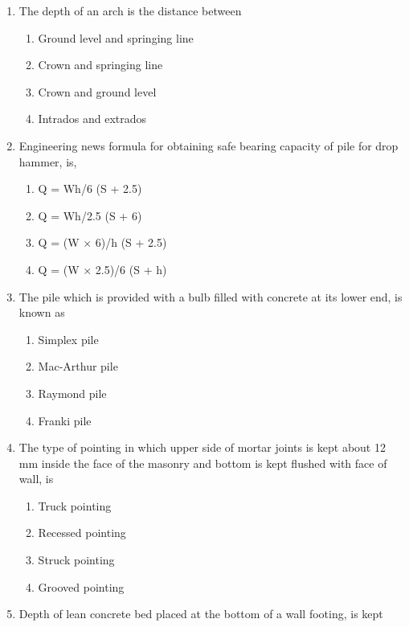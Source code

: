 \documentclass[11pt,a4paper]{article}
\begin{document}
\begin{enumerate}
\\
\item{The depth of an arch is the distance between}
\begin{enumerate}[label=\Alph*.]
\item{Ground level and springing line}
\item{Crown and springing line}
\item{Crown and ground level}
\item{Intrados and extrados}
\end{enumerate}
\item{Engineering news formula for obtaining safe bearing capacity of pile for drop hammer, is,}
\begin{enumerate}[label=\Alph*.]
\item{Q = Wh/6 (S + 2.5)}
\item{Q = Wh/2.5 (S + 6)}
\item{Q = (W $\times$ 6)/h (S + 2.5)}
\item{Q = (W $\times$ 2.5)/6 (S + h)}
\end{enumerate}
\item{The pile which is provided with a bulb filled with concrete at its lower end, is known as}
\begin{enumerate}[label=\Alph*.]
\item{Simplex pile}
\item{Mac-Arthur pile}
\item{Raymond pile}
\item{Franki pile}
\end{enumerate}
\item{The type of pointing in which upper side of mortar joints is kept about 12 mm inside the face of the masonry and bottom is kept flushed with face of wall, is}
\begin{enumerate}[label=\Alph*.]
\item{Truck pointing}
\item{Recessed pointing}
\item{Struck pointing}
\item{Grooved pointing}
\end{enumerate}
\item{Depth of lean concrete bed placed at the bottom of a wall footing, is kept}

\end{enumerate}
\end{document}
